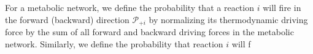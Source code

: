 For a metabolic network, we define the probability that a reaction $i$ will fire in the forward (backward)  direction ${\mathcal P_{+i}}$ by normalizing its thermodynamic driving force by the sum of all forward and backward driving forces in the metabolic network. Similarly, we define the probability that reaction $i$ will f